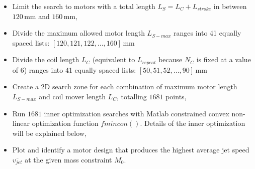                 
                \begin{itemize}
                    \item   Limit the search to motors with a total length $L_S = L_{C} + L_{stroke}$ in between $120\,\mathrm{mm}$ and $160\,\mathrm{mm}$,
                    \item   Divide the maximum allowed motor length $L_{S-max}$ ranges into 41 equally spaced lists: $[120, 121, 122, ..., 160]\,\mathrm{mm}$ 
                    \item   Divide the coil length $L_{C}$ (equivalent to $L_{repeat}$ because $N_C$ is fixed at a value of $6$) ranges into 41 equally spaced lists:  $[50, 51, 52, ..., 90]\,\mathrm{mm}$ 
                    \item   Create a $\mathrm{2D}$ search zone for each combination of maximum motor length $L_{S-max}$ and coil mover length $L_{C}$, totalling $1681$ points,
                    \item   Run $1681$ inner optimization searches with Matlab constrained convex non-linear optimization function $fmincon()$. Details of the inner optimization will be explained below,
                    \item   Plot and identify a motor design that produces the highest average jet speed $\overline{v_{jet}}$ at the given mass constraint $M_0$.
                \end{itemize}
                
